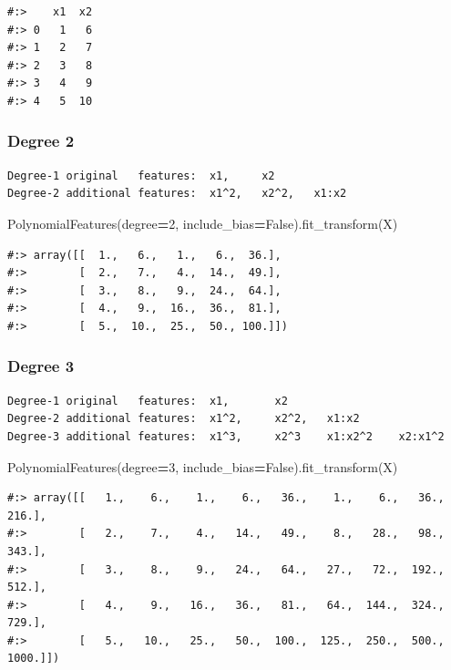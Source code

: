\documentclass[
]{book}
\newenvironment{Shaded}{\begin{snugshade}}{\end{snugshade}}
\newcommand{\DecValTok}[1]{\textcolor[rgb]{0.06,0.06,0.06}{#1}}
\newcommand{\NormalTok}[1]{#1}
\newcommand{\OperatorTok}[1]{\textcolor[rgb]{0.43,0.43,0.43}{\textbf{#1}}}
\newcommand{\VariableTok}[1]{\textcolor[rgb]{0,0,0}{#1}}
\begin{document}
\begin{verbatim}
#:>    x1  x2
#:> 0   1   6
#:> 1   2   7
#:> 2   3   8
#:> 3   4   9
#:> 4   5  10
\end{verbatim}

\hypertarget{degree-2-1}{%
\subsubsection{Degree 2}\label{degree-2-1}}

\begin{verbatim}
Degree-1 original   features:  x1,     x2  
Degree-2 additional features:  x1^2,   x2^2,   x1:x2 
\end{verbatim}

\begin{Shaded}
\begin{Highlighting}[]
\NormalTok{PolynomialFeatures(degree}\OperatorTok{=}\DecValTok{2}\NormalTok{, include_bias}\OperatorTok{=}\VariableTok{False}\NormalTok{).fit_transform(X)}
\end{Highlighting}
\end{Shaded}

\begin{verbatim}
#:> array([[  1.,   6.,   1.,   6.,  36.],
#:>        [  2.,   7.,   4.,  14.,  49.],
#:>        [  3.,   8.,   9.,  24.,  64.],
#:>        [  4.,   9.,  16.,  36.,  81.],
#:>        [  5.,  10.,  25.,  50., 100.]])
\end{verbatim}

\hypertarget{degree-3-1}{%
\subsubsection{Degree 3}\label{degree-3-1}}

\begin{verbatim}
Degree-1 original   features:  x1,       x2  
Degree-2 additional features:  x1^2,     x2^2,   x1:x2 
Degree-3 additional features:  x1^3,     x2^3    x1:x2^2    x2:x1^2
\end{verbatim}

\begin{Shaded}
\begin{Highlighting}[]
\NormalTok{PolynomialFeatures(degree}\OperatorTok{=}\DecValTok{3}\NormalTok{, include_bias}\OperatorTok{=}\VariableTok{False}\NormalTok{).fit_transform(X)}
\end{Highlighting}
\end{Shaded}

\begin{verbatim}
#:> array([[   1.,    6.,    1.,    6.,   36.,    1.,    6.,   36.,  216.],
#:>        [   2.,    7.,    4.,   14.,   49.,    8.,   28.,   98.,  343.],
#:>        [   3.,    8.,    9.,   24.,   64.,   27.,   72.,  192.,  512.],
#:>        [   4.,    9.,   16.,   36.,   81.,   64.,  144.,  324.,  729.],
#:>        [   5.,   10.,   25.,   50.,  100.,  125.,  250.,  500., 1000.]])
\end{verbatim}
\end{document}
